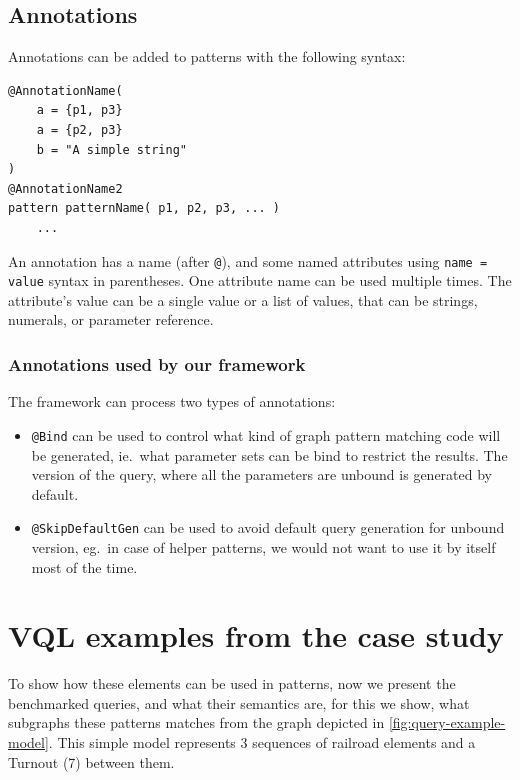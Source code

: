 \subsection{Annotations}

\begin{minipage}{\textwidth}
Annotations can be added to patterns with the following syntax:
\begin{lstlisting}[language=vql]
@AnnotationName(
	a = {p1, p3}
	a = {p2, p3}
	b = "A simple string"
)
@AnnotationName2
pattern patternName( p1, p2, p3, ... )
	...
\end{lstlisting}
\end{minipage}
\vspace{\belowdisplayskip}

An annotation has a name (after \texttt{@}), and some named attributes using \texttt{name = value} syntax in parentheses.
One attribute name can be used multiple times. 
The attribute's value can be a single value or a list of values, that can be strings, numerals, or parameter reference.


\subsubsection{Annotations used by our framework}

The framework can process two types of annotations:
\begin{itemize}
	\item \texttt{@Bind} can be used to control what kind of graph pattern matching code will be generated, ie.\ what parameter sets can be bind to restrict the results. The version of the query, where all the parameters are unbound is generated by default.
	
	\item \texttt{@SkipDefaultGen} can be used to avoid default query generation for unbound version, eg.\ in case of helper patterns, we would not want to use it by itself most of the time.
	
\end{itemize}


\section{VQL examples from the case study}
\label{sec:vql-examples}

To show how these elements can be used in patterns, now we present the benchmarked queries, and what their semantics are, for this we show, what subgraphs these patterns matches from the graph depicted in \autoref{fig:query-example-model}. This simple model represents 3 sequences of railroad elements and a Turnout (7) between them.
\vspace{0.1\textwidth}


